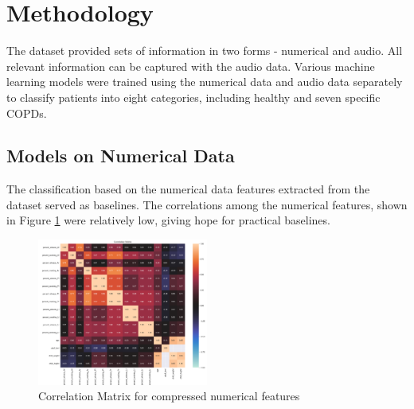 \documentclass[10pt,twocolumn,letterpaper]{article}
\begin{document}


\section{Methodology}
The dataset provided sets of information in two forms - numerical and audio. All relevant information can be captured with the audio data.
Various machine learning models were trained using the numerical data and audio data separately to classify patients into eight categories, including healthy and seven specific COPDs.

\subsection*{Models on Numerical Data}
The classification based on the numerical data features extracted from the dataset served as baselines. The correlations among the numerical features, shown in Figure \ref{fig:corr} were relatively low, giving hope for practical baselines.

\begin{figure}[htbp]
    \centerline{\includegraphics[width=0.5\textwidth]{corr.png}}
    \caption{Correlation Matrix for compressed numerical features}
    \label{fig:corr}
\end{figure}
\end{document}
